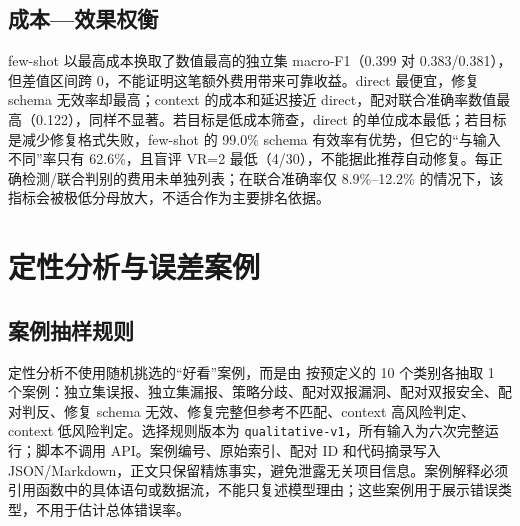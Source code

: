 \documentclass[conference]{IEEEtran}
\begin{document}


\subsection{成本—效果权衡}
few-shot 以最高成本换取了数值最高的独立集 macro-F1（0.399 对 0.383/0.381），但差值区间跨 0，不能证明这笔额外费用带来可靠收益。direct 最便宜，修复 schema 无效率却最高；context 的成本和延迟接近 direct，配对联合准确率数值最高（0.122），同样不显著。若目标是低成本筛查，direct 的单位成本最低；若目标是减少修复格式失败，few-shot 的 99.0\% schema 有效率有优势，但它的“与输入不同”率只有 62.6\%，且盲评 VR=2 最低（4/30），不能据此推荐自动修复。每正确检测/联合判别的费用未单独列表；在联合准确率仅 8.9\%--12.2\% 的情况下，该指标会被极低分母放大，不适合作为主要排名依据。

\section{定性分析与误差案例}
\label{sec:qualitative}

\subsection{案例抽样规则}
定性分析不使用随机挑选的“好看”案例，而是由  按预定义的 10 个类别各抽取 1 个案例：独立集误报、独立集漏报、策略分歧、配对双报漏洞、配对双报安全、配对判反、修复 schema 无效、修复完整但参考不匹配、context 高风险判定、context 低风险判定。选择规则版本为 \texttt{qualitative-v1}，所有输入为六次完整运行；脚本不调用 API。案例编号、原始索引、配对 ID 和代码摘录写入 JSON/Markdown，正文只保留精炼事实，避免泄露无关项目信息。案例解释必须引用函数中的具体语句或数据流，不能只复述模型理由；这些案例用于展示错误类型，不用于估计总体错误率。
\end{document}
